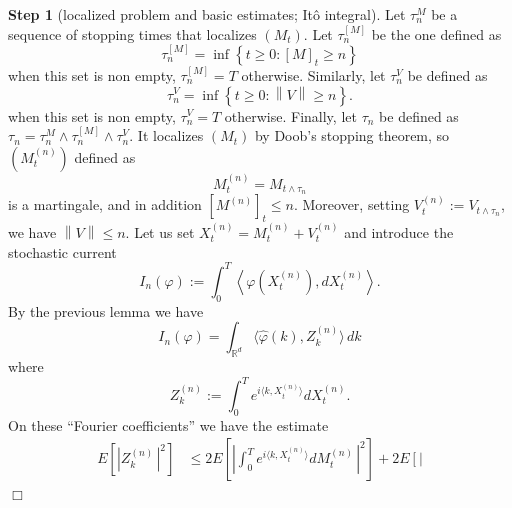 \documentclass{article}
\newenvironment{proof}[1][Proof]{{\sc #1.} }{\hfill $\Box$}
\begin{document}
\begin{proof}
\textbf{Step 1} (localized problem and basic estimates; It\^{o} integral).
Let $\tau _{n}^{M}$ be a sequence of stopping times that localizes $\left(
M_{t}\right) $. Let $\tau _{n}^{\left[ M\right] }$ be the one defined as 
\begin{equation*}
\tau _{n}^{\left[ M\right] }=\inf \left\{ t\geq 0:\left[ M\right] _{t}\geq
n\right\}
\end{equation*}
when this set is non empty, $\tau _{n}^{\left[ M\right] }=T$ otherwise.
Similarly, let $\tau _{n}^{V}$ be defined as 
\begin{equation*}
\tau _{n}^{V}=\inf \left\{ t\geq 0:\left\| V\right\| \geq n\right\} .
\end{equation*}
when this set is non empty, $\tau _{n}^{V}=T$ otherwise. Finally, let $\tau
_{n}$ be defined as $\tau _{n}=\tau _{n}^{M}\wedge \tau _{n}^{\left[ M\right]
}\wedge \tau _{n}^{V}$. It localizes $\left( M_{t}\right) $ by Doob's stopping
theorem, so $\left( M_{t}^{\left( n\right) }\right) $ defined as 
\begin{equation*}
M_{t}^{\left( n\right) }=M_{t\wedge \tau _{n}}
\end{equation*}
is a martingale, and in addition $\left[ M^{\left( n\right) }\right]
_{t}\leq n$. Moreover, setting $V_{t}^{\left( n\right) }:=V_{t\wedge \tau
_{n}}$, we have $\left\| V\right\| \leq n$. Let us set $X_{t}^{\left(
n\right) }=M_{t}^{\left( n\right) }+V_{t}^{\left( n\right) }$ and introduce
the stochastic current 
\begin{equation*}
I_{n}\left( \varphi \right) :=\int_{0}^{T}\left\langle \varphi (
X_{t}^{\left( n\right) }) ,dX_{t}^{\left( n\right) }\right\rangle .
\end{equation*}
By the previous lemma we have 
\begin{equation*}
I_{n}\left( \varphi \right) =\int_{\mathbb{R}^{d}} \langle \hat{\varphi}%
( k ) ,Z_{k}^{( n) }\rangle \,dk
\end{equation*}
where 
\begin{equation*}
Z_{k}^{\left( n\right) }:=\int_{0}^{T}e^{i\langle k,X_{t}^{(
n) }\rangle }dX_{t}^{( n) }.
\end{equation*}
On these ``Fourier coefficients'' we have the estimate 
\begin{equation*}
\begin{split}
E\left[ \left| Z_{k}^{\left( n\right) }\,\right| ^{2}\right] & \leq 2E\left[
\left| \int_{0}^{T}e^{i\langle k,X_{t}^{( n) }\rangle
}dM_{t}^{\left( n\right) }\,\right| ^{2}\right] +2E\left[ \left|

\end{split}
\end{equation*}
\end{proof}
\end{document}
